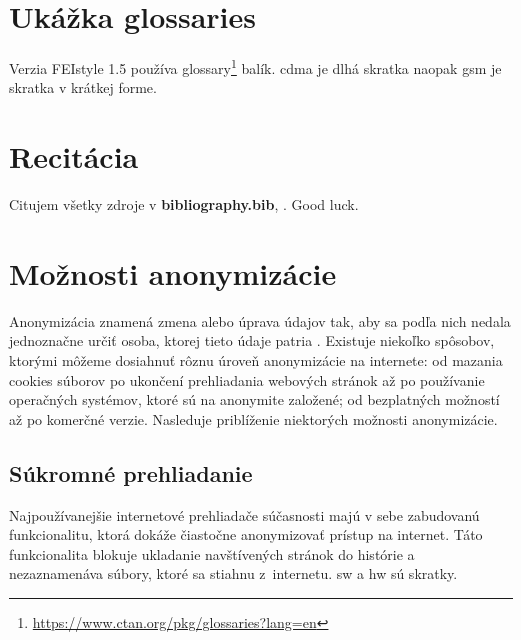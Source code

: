 





\section{Ukážka glossaries}
\noindent Verzia FEIstyle 1.5 používa glossary\footnote{\url{https://www.ctan.org/pkg/glossaries?lang=en}} balík.
\acrfull{cdma} je dlhá skratka naopak \acrshort{gsm} je skratka v krátkej forme.
\section{Recitácia}
Citujem všetky zdroje v \textbf{bibliography.bib}, \cite{t00}. \newline Good luck.
\section{Možnosti anonymizácie}
\noindent Anonymizácia znamená zmena alebo úprava údajov tak, aby sa podľa nich nedala jednoznačne určiť osoba, ktorej tieto údaje patria \cite{t01}. Existuje niekoľko spôsobov, ktorými môžeme dosiahnuť rôznu úroveň anonymizácie na internete: od mazania cookies súborov po ukončení prehliadania webových stránok až po používanie operačných systémov, ktoré sú na anonymite založené; od bezplatných možností až po komerčné verzie.  
\newline Nasleduje priblíženie niektorých možnosti anonymizácie.

\subsection{Súkromné prehliadanie}
\noindent Najpoužívanejšie internetové prehliadače súčasnosti majú v sebe zabudovanú funkcionalitu, ktorá dokáže čiastočne anonymizovať prístup na internet. Táto funkcionalita blokuje ukladanie navštívených stránok do histórie a nezaznamenáva súbory, ktoré sa stiahnu z~internetu. \acrshort{sw} a \acrlong{hw} sú skratky.

